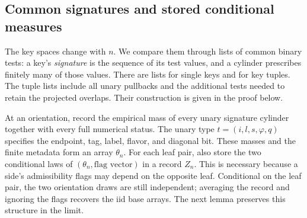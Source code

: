 \subsection{Common signatures and stored conditional measures}

The key spaces change with $n$. We compare them through lists of common
binary tests: a key's \emph{signature} is the sequence of its test values,
and a cylinder prescribes finitely many of those values. There are lists
for single keys and for key tuples. The tuple lists include all unary
pullbacks and the additional tests needed to retain the projected
overlaps. Their construction is given in the proof below.

At an orientation, record the empirical mass of every unary signature
cylinder together with every full numerical status. The unary type
$t=(i,l,s,\varphi,q)$ specifies the endpoint, tag, label, flavor, and
diagonal bit. These masses and the finite metadata form an array
$\theta_n$. For each leaf pair, also store the two conditional laws of
$(\theta_n,\text{flag vector})$ in a record $Z_n$. This is necessary
because a side's admissibility flags may depend on the opposite leaf.
Conditional on the leaf pair, the two orientation draws are still
independent; averaging the record and ignoring the flags recovers the
iid base arrays. The next lemma preserves this structure in the limit.

